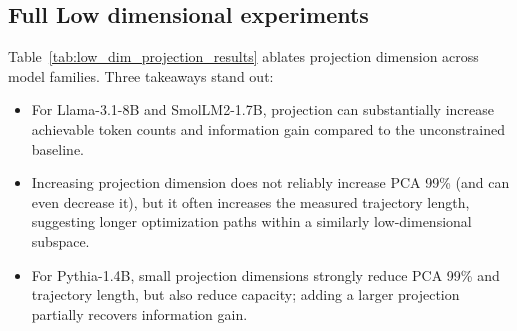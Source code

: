\begin{table}[tb]
    \centering
    \caption{Full sweep of activation alignment and low-dimensional projection hyperparameters. ``$\alpha$'' is alignment strength, ``$L$'' is the number of aligned layers, and ``dim'' is projection dimension.}\label{tab:full_activation_alignment_and_low_dim_projections}

    \begin{small}
    
    \end{small}
\vskip -0.1in

\end{table}


\subsection{Full Low dimensional experiments}

Table~\ref{tab:low_dim_projection_results} ablates projection dimension across model families.
Three takeaways stand out:
\begin{itemize}
    \item For Llama-3.1-8B and SmolLM2-1.7B, projection can substantially increase achievable token counts and information gain compared to the unconstrained baseline.
    \item Increasing projection dimension does not reliably increase PCA 99\% (and can even decrease it), but it often increases the measured trajectory length, suggesting longer optimization paths within a similarly low-dimensional subspace.
    \item For Pythia-1.4B, small projection dimensions strongly reduce PCA 99\% and trajectory length, but also reduce capacity; adding a larger projection partially recovers information gain.
\end{itemize}


\begin{table}[tb]
    \centering
    \caption{Effect of low-dimensional projection size on progressive cramming. ``dim'' in the model column denotes the projection dimension $k$ (Section~\ref{sec:lowdim}).}
    \label{tab:low_dim_projection_results}

    \begin{small}
    
    \end{small}
\vskip -0.1in

\end{table}

